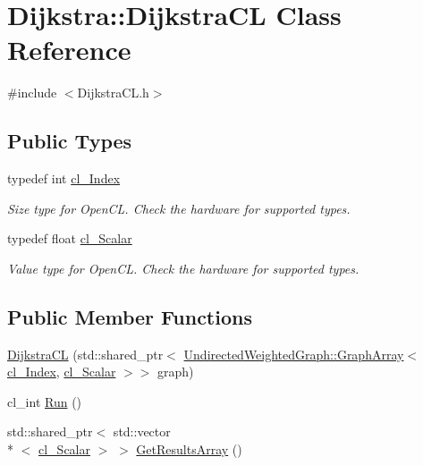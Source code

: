 \hypertarget{class_dijkstra_1_1_dijkstra_c_l}{\section{Dijkstra\+:\+:Dijkstra\+C\+L Class Reference}
\label{class_dijkstra_1_1_dijkstra_c_l}
}


{\ttfamily \#include $<$Dijkstra\+C\+L.\+h$>$}

\subsection*{Public Types}
\begin{DoxyCompactItemize}
\item 
typedef int \hyperlink{class_dijkstra_1_1_dijkstra_c_l_aab92585b062690f0835f154dc28f8c04}{cl\+\_\+\+Index}
\begin{DoxyCompactList}\small\item\em Size type for Open\+C\+L. Check the hardware for supported types. \end{DoxyCompactList}\item 
typedef float \hyperlink{class_dijkstra_1_1_dijkstra_c_l_a5dc96724577a49ee14d4c2e1df3c0579}{cl\+\_\+\+Scalar}
\begin{DoxyCompactList}\small\item\em Value type for Open\+C\+L. Check the hardware for supported types. \end{DoxyCompactList}\end{DoxyCompactItemize}
\subsection*{Public Member Functions}
\begin{DoxyCompactItemize}
\item 
\hyperlink{class_dijkstra_1_1_dijkstra_c_l_a568bd4b94630d1add7a753b827b518e1}{Dijkstra\+C\+L} (std\+::shared\+\_\+ptr$<$ \hyperlink{struct_undirected_weighted_graph_1_1_graph_array}{Undirected\+Weighted\+Graph\+::\+Graph\+Array}$<$ \hyperlink{class_dijkstra_1_1_dijkstra_c_l_aab92585b062690f0835f154dc28f8c04}{cl\+\_\+\+Index}, \hyperlink{class_dijkstra_1_1_dijkstra_c_l_a5dc96724577a49ee14d4c2e1df3c0579}{cl\+\_\+\+Scalar} $>$$>$ graph)
\item 
cl\+\_\+int \hyperlink{class_dijkstra_1_1_dijkstra_c_l_adaceb81f91f37f7533c8e64446a4845b}{Run} ()
\item 
std\+::shared\+\_\+ptr$<$ std\+::vector\\*
$<$ \hyperlink{class_dijkstra_1_1_dijkstra_c_l_a5dc96724577a49ee14d4c2e1df3c0579}{cl\+\_\+\+Scalar} $>$ $>$ \hyperlink{class_dijkstra_1_1_dijkstra_c_l_aafeab7cb87014b004bf788387290eaa6}{Get\+Results\+Array} ()
\end{DoxyCompactItemize}
